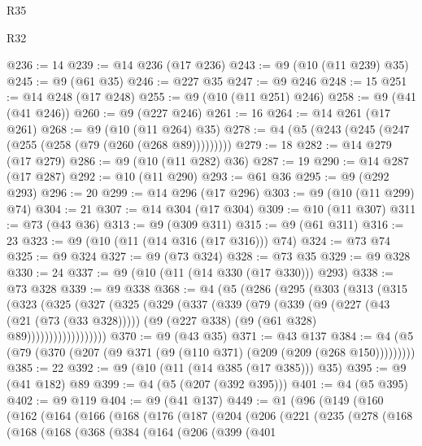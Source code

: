 \begin{lexlean}{R35}
\begin{lexlean}{R32}
\begin{coremodule}
{{{{{{{{{{{{{{{{{{{{{{{{{{{{{{{{{{{{{{{{{{{{{{{{{{{@236 := 14
@239 := @14 @236 (@17 @236)
@243 := @9 (@10 (@11 @239) @35)
@245 := @9 (@61 @35)
@246 := @227 @35
@247 := @9 @246
@248 := 15
@251 := @14 @248 (@17 @248)
@255 := @9 (@10 (@11 @251) @246)
@258 := @9 (@41 (@41 @246))
@260 := @9 (@227 @246)
@261 := 16
@264 := @14 @261 (@17 @261)
@268 := @9 (@10 (@11 @264) @35)
@278 := @4 (@5 (@243 (@245 (@247 (@255 (@258 (@79 (@260 (@268 @89)))))))))
@279 := 18
@282 := @14 @279 (@17 @279)
@286 := @9 (@10 (@11 @282) @36)
@287 := 19
@290 := @14 @287 (@17 @287)
@292 := @10 (@11 @290)
@293 := @61 @36
@295 := @9 (@292 @293)
@296 := 20
@299 := @14 @296 (@17 @296)
@303 := @9 (@10 (@11 @299) @74)
@304 := 21
@307 := @14 @304 (@17 @304)
@309 := @10 (@11 @307)
@311 := @73 (@43 @36)
@313 := @9 (@309 @311)
@315 := @9 (@61 @311)
@316 := 23
@323 := @9 (@10 (@11 (@14 @316 (@17 @316))) @74)
@324 := @73 @74
@325 := @9 @324
@327 := @9 (@73 @324)
@328 := @73 @35
@329 := @9 @328
@330 := 24
@337 := @9 (@10 (@11 (@14 @330 (@17 @330))) @293)
@338 := @73 @328
@339 := @9 @338
@368 := @4
    (@5
      (@286
        (@295
          (@303
            (@313
              (@315
                (@323
                  (@325
                    (@327
                      (@325
                        (@329
                          (@337
                            (@339
                              (@79
                                (@339
                                  (@9
                                    (@227 (@43 (@21 (@73 (@33 @328)))))
                                    (@9 (@227 @338) (@9 (@61 @328) @89))))))))))))))))))
@370 := @9 (@43 @35)
@371 := @43 @137
@384 := @4 (@5 (@79 (@370 (@207 (@9 @371 (@9 (@110 @371) (@209 (@209 (@268 @150)))))))))
@385 := 22
@392 := @9 (@10 (@11 (@14 @385 (@17 @385))) @35)
@395 := @9 (@41 @182) @89
@399 := @4 (@5 (@207 (@392 @395)))
@401 := @4 (@5 @395)
@402 := @9 @119
@404 := @9 (@41 @137)
@449 := @1
    (@96
      (@149
        (@160
          (@162
            (@164
              (@166
                (@168
                  (@176
                    (@187
                      (@204
                        (@206
                          (@221
                            (@235
                              (@278
                                (@168
                                  (@168
                                    (@168
                                      (@368
                                        (@384
                                          (@164
                                            (@206
                                              (@399
                                                (@401
}}}}}}}}}}}}}}}}}}}}}}}}}}}}}}}}}}}}}}}}}}}}}}}}}}}
\end{coremodule}
\end{lexlean}
\end{lexlean}
